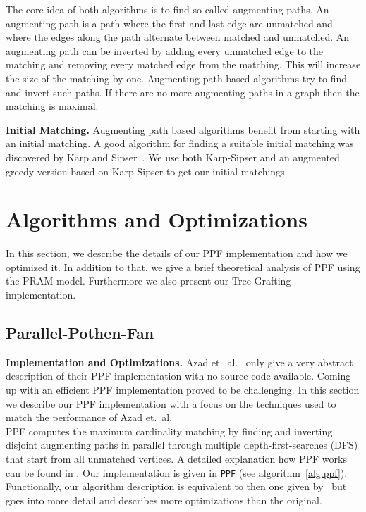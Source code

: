 \documentclass[letterpaper]{article}
\newcommand{\mypar}[1]{{\bf #1.}}
\begin{document}
The core idea of both algorithms is to find so called augmenting paths. An augmenting path is a path where the first 
and last edge are unmatched and where the edges along the path alternate between matched and unmatched. 
An augmenting path can be inverted by adding every unmatched edge to the matching and removing every matched edge from the matching. 
This will increase the size of the matching by one. 
Augmenting path based algorithms try to find and invert such paths. If there are no more augmenting paths in a graph then the matching is maximal.

\mypar{Initial Matching}
Augmenting path based algorithms benefit from starting with an initial matching. 
A good algorithm for finding a suitable initial matching was discovered by Karp and Sipser~\cite{KarpS81}.
We use both Karp-Sipser and an augmented greedy version based on Karp-Sipser to get our initial matchings. 

\section{Algorithms and Optimizations}\label{sec:pfopt}

In this section, we describe the details of our PPF implementation and how we optimized it. In addition to that, we 
give a brief theoretical analysis of PPF using the PRAM model. Furthermore we also present our Tree Grafting implementation.

\subsection{Parallel-Pothen-Fan}\label{sec:pf}

\mypar{Implementation and Optimizations} Azad et.\ al.~\cite{Azad:2012} only give a very abstract description of their PPF implementation with no source code available. 
Coming up with an efficient PPF implementation proved to be challenging. 
In this section we describe our PPF implementation with a focus on the techniques used to match the performance of Azad et.\ al.\\

PPF computes the maximum cardinality matching by finding and inverting disjoint augmenting paths in parallel through multiple depth-first-searches (DFS)
that start from all unmatched vertices. A detailed explanation how PPF works can be found in \cite{Azad:2012}. 
Our implementation is given in \texttt{PPF} (see algorithm~\ref{alg:ppf}). 
Functionally, our algorithm description is equivalent to then one given by~\cite{Azad:2012} 
but goes into more detail and describes more optimizations than the original.\\
\end{document}
